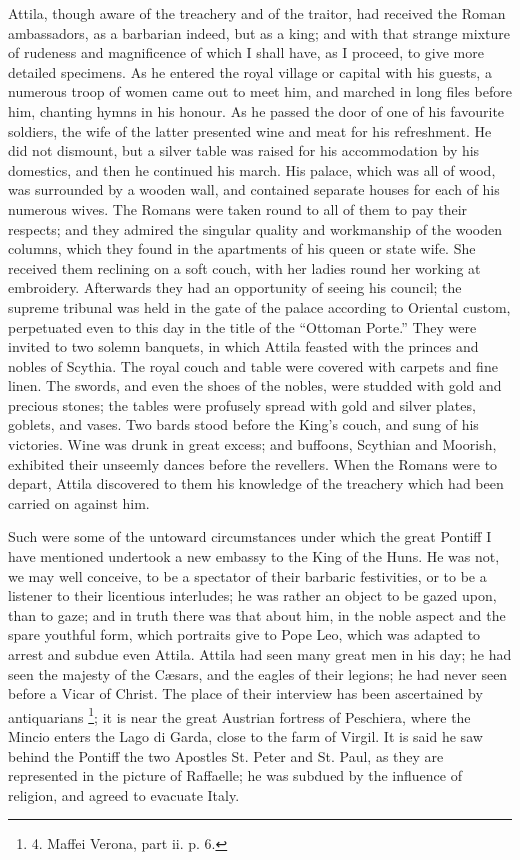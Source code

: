Attila, though aware of the
treachery and of the traitor, had received the Roman ambassadors, as a
barbarian indeed, but as a king; and with that strange mixture of
rudeness and magnificence of which I shall have, as I proceed, to give
more detailed specimens. As he entered the royal village or capital
with his guests, a numerous troop of women came out to meet him, and
marched in long files before him, chanting hymns in his honour. As he
passed the door of one of his favourite soldiers, the wife of the
latter presented wine and meat for his refreshment. He did not
dismount, but a silver table was raised for his accommodation by his
domestics, and then he continued his march. His palace, which was all
of wood, was surrounded by a wooden wall, and contained separate
houses for each of his numerous wives. The Romans were taken round to
all of them to pay their respects; and they admired the singular
quality and workmanship of the wooden columns, which they found in the
apartments of his queen or state wife. She received them reclining on
a soft couch, with her ladies round her working at embroidery.
Afterwards they had an opportunity of seeing his council; the supreme
tribunal was held in the gate of the palace according to Oriental
custom, perpetuated even to this day in the title of the ``Ottoman
Porte.'' They were invited to two solemn banquets, in which Attila
feasted with the princes and nobles of Scythia. The royal couch and
table were covered with carpets and fine linen. The swords, and even
the shoes of the nobles, were studded with gold and precious stones;
the tables were profusely spread with gold and silver plates,
goblets, and vases. Two bards stood before the King's couch, and sung
of his victories. Wine was drunk in great excess; and buffoons,
Scythian and Moorish, exhibited their unseemly dances before the
revellers. When the Romans were to depart, Attila discovered to them
his knowledge of the treachery which had been carried on against him.

Such were some of the untoward
circumstances under which the great Pontiff I have mentioned undertook
a new embassy to the King of the Huns. He was not, we may well
conceive, to be a spectator of their barbaric festivities, or to be a
listener to their licentious interludes; he was rather an object to be
gazed upon, than to gaze; and in truth there was that about him, in
the noble aspect and the spare youthful form, which portraits give to
Pope Leo, which was adapted to arrest and subdue even Attila. Attila
had seen many great men in his day; he had seen the majesty of the Cæsars,
and the eagles of their legions; he had never seen before a Vicar of
Christ. The place of their interview has been ascertained by
antiquarians \footnote{4.
Maffei Verona, part ii. p. 6.}; it is near
the great Austrian fortress of Peschiera, where the Mincio enters the
Lago di Garda, close to the farm of Virgil. It is said he saw behind
the Pontiff the two Apostles St. Peter and St. Paul, as they are
represented in the picture of Raffaelle; he was subdued by the
influence of religion, and agreed to evacuate Italy.

